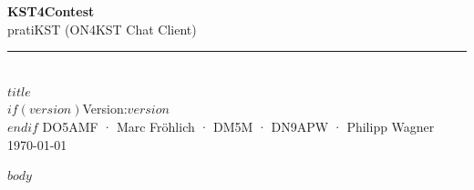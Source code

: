 \documentclass[11pt,a4paper]{article}
\begin{document}
\begin{titlepage}
  \pagecolor{brand-green}
  \centering
  \vspace*{3.5cm}
  {\fontsize{52}{62}\selectfont\bfseries\color{white}KST4Contest}\\[0.4cm]
  {\fontsize{22}{28}\selectfont\color{white!75!brand-green}pratiKST (ON4KST Chat Client)}\\[2.8cm]
  \color{white!40!brand-green}\rule{10cm}{0.6pt}\\[1.8cm]
  {\LARGE\bfseries\color{white}$title$}\\[1cm]
  $if(version)${\large\color{white!80!brand-green}Version:\space{}$version$}\\[0.6cm]$endif$
  \vfill
  {\large\color{white}DO5AMF · Marc Fröhlich · DM5M · DN9APW · Philipp Wagner}\\[0.4cm]
  {\color{white!70!brand-green}\today}\\[2cm]
\end{titlepage}

\pagecolor{white}
\newpage

\tableofcontents
\newpage

$body$
\end{document}
